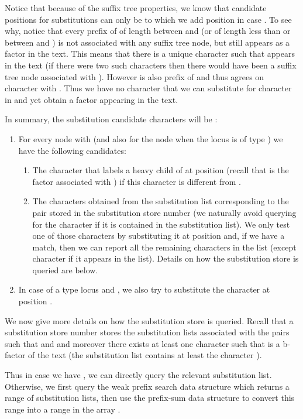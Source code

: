 \documentclass{article}
\newcommand{\?}{\mskip1.5mu}
\begin{document}
Notice that because of the suffix tree properties, we know that candidate positions for substitutions can only be  to which we add position  in case . To see why, notice that every prefix  of  of length between  and  (or of length less than  or  between  and ) is not associated with any suffix tree node, but still appears as a factor in the text. This means that there is a unique character  such that  appears in the text (if there were two such characters then there would have been a suffix tree node associated with ). However  is also prefix of  and thus agrees on character  with . Thus we have no character that we can substitute for character  in  and yet obtain a factor appearing in the text. 

In summary, the substitution candidate characters will be :
\begin{enumerate}
\item For every node  with  (and also for the node  when the locus is of type ) we have the following candidates:
\begin{enumerate}
\item The character that labels a heavy child of  at position  (recall that  is the factor associated with ) if this character is different from . 
\item The characters obtained from the substitution list corresponding to the pair  stored in the substitution store number  (we naturally avoid querying for the character  if it is contained in the substitution list). We only test one of those characters by substituting it at position  and, if we have a match, then we can report all the remaining characters in the list (except character  if it appears in the list). Details on how the substitution store is queried are below. 
\end{enumerate}
\item In case of a type  locus and , we also try to substitute the character  at position . 
\end{enumerate}

We now give more details on how the substitution store is queried. Recall that a substitution store number  stores the substitution lists associated with the pairs  such that  and  and moreover there exists at least one character  such that  is a b-factor of the text (the substitution list contains at least the character ). 

Thus in case we have , we can directly query the relevant substitution list. 
Otherwise, we first query the weak prefix search data structure which returns a range of substitution lists, then use the prefix-sum data structure to convert this range into a range in the array .
\end{document}
